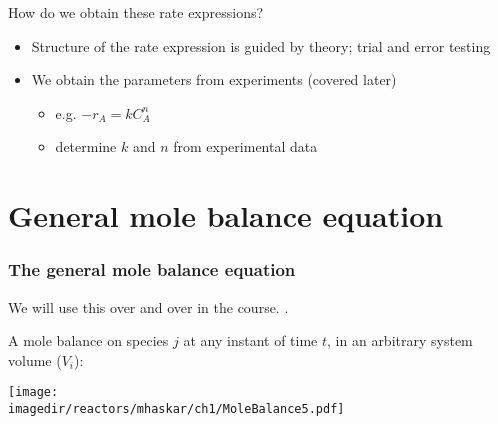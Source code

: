 \begin{frame}{How do we obtain these rate expressions?}

	\begin{itemize}
		\item	Structure of the rate expression is guided by theory; trial and error testing
		\vspace{12pt}
		\item	We obtain the parameters from experiments (covered later)
			\begin{itemize}
				\item	e.g. $-r_A = kC_A^n$
				\item	determine $k$ and $n$ from experimental data
			\end{itemize}
	\end{itemize}
\end{frame}

\section{General mole balance equation}

\begin{frame}\frametitle{The general mole balance equation}
	We will use this over and over in the course. {\color{myOrange}{Let's understand this}}.

	\begin{exampleblock}{}
		A mole balance on species $j$ at any instant of time $t$, in an arbitrary system volume ($V_i$):
		\begin{center}
			\texttt{[image: \\imagedir/reactors/mhaskar/ch1/MoleBalance5.pdf]}
		\end{center}
	\end{exampleblock}
\end{frame}

